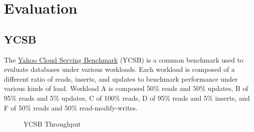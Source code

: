 \documentclass{article}
\begin{document}
  \section{Evaluation}

    \subsection{YCSB}
    The \href{https://github.com/brianfrankcooper/YCSB}{Yahoo Cloud Serving Benchmark} (YCSB) is a
    common benchmark used to evaluate databases under various workloads. Each workload is composed of
    a different ratio of reads, inserts, and updates to benchmark performance under various kinds of
    load. Workload A is composed 50\% reads and 50\% updates, B of 95\% reads and 5\% updates, C of
    100\% reads, D of 95\% reads and 5\% inserts, and F of 50\% reads and 50\% read-modify-writes.

    \begin{figure}
    \caption{YCSB Throughput}
    \label{ycsb-throughput}
    \centering
    \end{figure}
\end{document}
